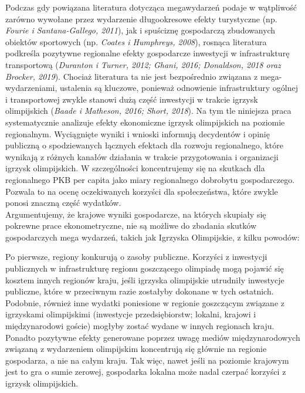 \documentclass[12pt]{article}
\begin{document}
Podczas gdy powiązana literatura dotycząca megawydarzeń podaje w wątpliwość zarówno wywołane przez wydarzenie długookresowe efekty turystyczne (np. \textit{Fourie i Santana-Gallego, 2011}), jak i spuściznę gospodarczą zbudowanych obiektów sportowych (np. \textit{Coates i Humphreys, 2008}), rosnąca literatura podkreśla pozytywne regionalne efekty gospodarcze inwestycji w infrastrukturę transportową (\textit{Duranton i Turner, 2012; Ghani, 2016; Donaldson, 2018 oraz Brocker, 2019}). Chociaż literatura ta nie jest bezpośrednio związana z mega-wydarzeniami, ustalenia są kluczowe, ponieważ odnowienie infrastruktury ogólnej i transportowej zwykle stanowi dużą część inwestycji w trakcie igrzysk olimpijskich (\textit{Baade i Matheson, 2016; Short, 2018}). Na tym tle niniejsza praca systematycznie analizuje efekty ekonomiczne igrzysk olimpijskich na poziomie regionalnym. Wyciągnięte wyniki i wnioski informują decydentów i opinię publiczną o spodziewanych łącznych efektach dla rozwoju regionalnego, które wynikają z różnych kanałów działania w trakcie przygotowania i organizacji igrzysk olimpijskich. W szczególności koncentrujemy się na skutkach dla regionalnego PKB per capita jako miary regionalnego dobrobytu gospodarczego. Pozwala to na ocenę oczekiwanych korzyści dla społeczeństwa, które zwykle ponosi znaczną część wydatków.\\

Argumentujemy, że krajowe wyniki gospodarcze, na których skupiały się pokrewne prace ekonometryczne, nie są możliwe do zbadania skutków gospodarczych mega wydarzeń, takich jak Igrzyska Olimpijskie, z kilku powodów: 

Po pierwsze, regiony konkurują o zasoby publiczne. Korzyści z inwestycji publicznych w infrastrukturę regionu goszczącego olimpiadę mogą pojawić się kosztem innych regionów kraju, jeśli igrzyska olimpijskie utrudniły inwestycje publiczne, które w przeciwnym razie zostałyby dokonane w tych ostatnich. Podobnie, również inne wydatki poniesione w regionie goszczącym związane z igrzyskami olimpijskimi (inwestycje przedsiębiorstw; lokalni, krajowi i międzynarodowi goście) mogłyby zostać wydane w innych regionach kraju.
Ponadto pozytywne efekty generowane poprzez uwagę mediów międzynarodowych związaną z wydarzeniem olimpijskim koncentrują się głównie na regionie gospodarza, a nie na całym kraju. Tak więc, nawet jeśli na poziomie krajowym jest to gra o sumie zerowej, gospodarka lokalna może nadal czerpać korzyści z igrzysk olimpijskich. 
\end{document}
